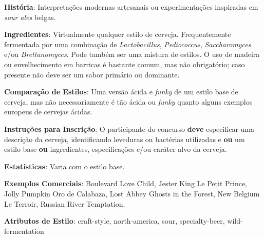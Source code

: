 \textbf{História}: Interpretações modernas artesanais ou experimentações inspiradas em \textit{sour ales} belgas.

\textbf{Ingredientes}: Virtualmente qualquer estilo de cerveja. Frequentemente fermentada por uma combinação de \textit{Lactobacillus}, \textit{Pediococcus}, \textit{Saccharomyces} e/ou \textit{Brettanomyces}. Pode também ser uma mistura de estilos. O uso de madeira ou envelhecimento em barricas é bastante comum, mas não obrigatório; caso presente não deve ser um sabor primário ou dominante.

\textbf{Comparação de Estilos}: Uma versão ácida e \textit{funky} de um estilo base de cerveja, mas não necessariamente é tão ácida ou \textit{funky} quanto alguns exemplos europeus de cervejas ácidas.

\textbf{Instruções para Inscrição}: O participante do concurso \textbf{deve} especificar uma descrição da cerveja, identificando leveduras ou bactérias utilizadas e \textbf{ou} um estilo base \textbf{ou} ingredientes, especificações e/ou caráter alvo da cerveja.

\textbf{Estatísticas}: Varia com o estilo base.

\textbf{Exemplos Comerciais}: Boulevard Love Child, Jester King Le Petit Prince, Jolly Pumpkin Oro de Calabaza, Lost Abbey Ghosts in the Forest, New Belgium Le Terroir, Russian River Temptation.

\textbf{Atributos de Estilo}: craft-style, north-america, sour, specialty-beer, wild-fermentation
